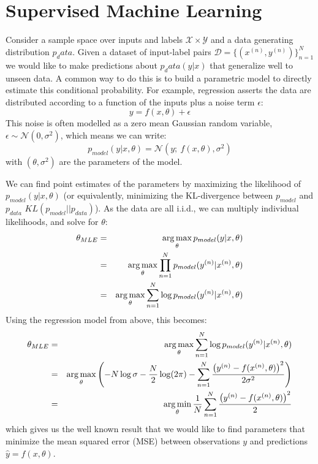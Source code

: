 \section{Supervised Machine Learning}
Consider a sample space over inputs and labels $\mathcal{X} \times \mathcal{Y}$
and a data generating distribution $p_data$. Given a dataset of input-label
pairs $\mathcal{D} = \{(x^{(n)}, y^{(n)})\}_{n=1}^N$ we would like to make
predictions about $p_data(y|x)$ that generalize well to unseen data. A common
way to do this is to build a parametric model to directly estimate this
conditional probability.  For example, regression asserts the data are
distributed according to a function of the inputs plus a noise term $\epsilon$:
\begin{equation}
  y = f(x, \theta) + \epsilon
\end{equation}
This noise is often modelled as a zero mean Gaussian random variable, $\epsilon
\sim \mathcal{N}(0, \sigma^2)$, which means we can write:
\begin{equation}\label{eq:ch2:regression}
  p_{model}(y|x, \theta) = \mathcal{N}(y;\ f(x, \theta), \sigma^2)
\end{equation}
with $(\theta, \sigma^2)$ are the parameters of the model. 

We can find point estimates of the parameters by maximizing the likelihood of
$p_{model}(y|x, \theta)$ (or equivalently, minimizing the KL-divergence between
$p_{model}$ and $p_{data}$ $KL(p_{model}||p_{data})$). As the data are all
i.i.d., we can multiply individual likelihoods, and solve for $\theta$:
\begin{eqnarray}
  \theta_{MLE} &=& \operatorname*{arg\,max}_{\theta} p_{model}(y|x, \theta) \\
              &=& \operatorname*{arg\,max}_{\theta} \prod_{n=1}^{N} p_{model}(y^{(n)}|x^{(n)}, \theta) \\
              &=& \operatorname*{arg\,max}_{\theta} \sum_{n=1}^N \log p_{model}(y^{(n)}|x^{(n)}, \theta)
\end{eqnarray}
Using the regression model from above, this becomes:
\begin{eqnarray} 
  \theta_{MLE} &=& \operatorname*{arg\,max}_{\theta} \sum_{n=1}^N \log p_{model}(y^{(n)}|x^{(n)}, \theta) \\
              &=& \operatorname*{arg\,max}_{\theta} \left(-N\log \sigma - \frac{N}{2}\log (2\pi) - \sum_{n=1}^{N}
                  \frac{\left(y^{(n)} - f(x^{(n)}, \theta)\right)^2}{2\sigma^2}\right) \\
                  &=& \operatorname*{arg\,min}_{\theta}\frac{1}{N}\sum_{n=1}^{N} \frac{\left(y^{(n)} - f(x^{(n)}, \theta)\right)^2}{2} \label{eq:ch2:mle_reg}
\end{eqnarray}
which gives us the well known result that we would like to find parameters that
minimize the mean squared error (MSE) between observations $y$ and predictions
$\hat{y} = f(x, \theta)$.

